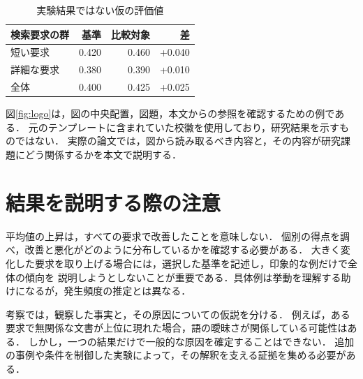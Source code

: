 \begin{table}[htbp]
  \centering
  \caption{実験結果ではない仮の評価値}
  \label{tab:results}
  \begin{tabular}{lrrr}\hline
    検索要求の群 & 基準 & 比較対象 & 差\\\hline
    短い要求 & 0.420 & 0.460 & +0.040\\
    詳細な要求 & 0.380 & 0.390 & +0.010\\
    全体 & 0.400 & 0.425 & +0.025\\\hline
  \end{tabular}
\end{table}

図\ref{fig:logo}は，図の中央配置，図題，本文からの参照を確認するための例である．
元のテンプレートに含まれていた校徽を使用しており，研究結果を示すものではない．
実際の論文では，図から読み取るべき内容と，その内容が研究課題にどう関係するかを本文で説明する．


\section{結果を説明する際の注意}
平均値の上昇は，すべての要求で改善したことを意味しない．
個別の得点を調べ，改善と悪化がどのように分布しているかを確認する必要がある．
大きく変化した要求を取り上げる場合には，選択した基準を記述し，印象的な例だけで全体の傾向を
説明しようとしないことが重要である．具体例は挙動を理解する助けになるが，発生頻度の推定とは異なる．

考察では，観察した事実と，その原因についての仮説を分ける．
例えば，ある要求で無関係な文書が上位に現れた場合，語の曖昧さが関係している可能性はある．
しかし，一つの結果だけで一般的な原因を確定することはできない．
追加の事例や条件を制御した実験によって，その解釈を支える証拠を集める必要がある．

